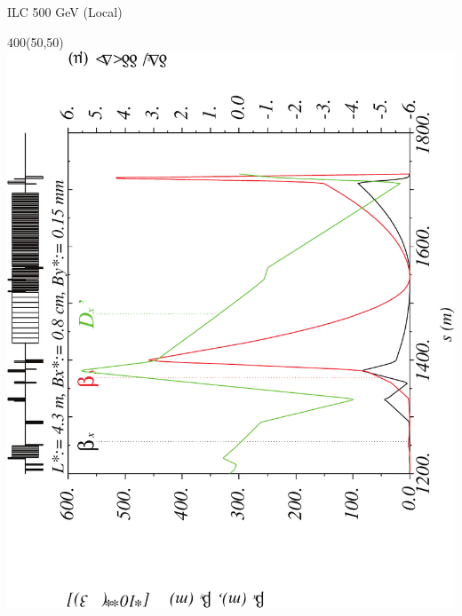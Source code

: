 \documentclass{beamer}
\begin{document}
\begin{frame}{ILC 500 GeV (Local)}
  \setlength{\TPHorizModule}{1pt}
  \setlength{\TPVertModule}{1pt}
 \begin{textblock}{400}(50,50)
 \includegraphics[scale=0.4,angle=-90]{ILClocal_ddx-crop.pdf}
 \end{textblock}
\end{frame}
\end{document}
